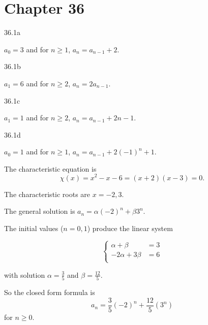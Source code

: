    \section*{Chapter 36}
   
       
\begin{Solution}{36.1a}

$a_{0} = 3$ and for $n\geq 1$, $a_{n} = a_{n-1}+2$.

\end{Solution}

\begin{Solution}{36.1b}

$a_{1} = 6$ and for $n\geq 2$, $a_{n} = 2a_{n-1}$.

\end{Solution}


\begin{Solution}{36.1c}

$a_{1} = 1$ and for $n\geq 2$, $a_{n} = a_{n-1} + 2n-1$.

\end{Solution}


\begin{Solution}{36.1d}

$a_{0} = 1$ and for $n\geq 1$, $a_{n} = a_{n-1}+2(-1)^n+1$.

\end{Solution}


\begin{Solution}{36.2}

The characteristic equation is 
\[
\chi(x) = x^{2} - x -6 = (x+2)(x-3) =0.
\] 

The characteristic roots are $x = -2, 3$.

The general solution is $a_{n}=\alpha (-2)^{n} + \beta3^{n}$.

The initial values ($n = 0,1$)  produce the linear system

\[
  \left\{
    \begin{aligned}
     \alpha + \beta &= 3\\
     -2\alpha + 3\beta &= 6\\
     \end{aligned}
   \right.
\]
   
with solution $\alpha = \frac{3}{5}$ and $\beta = \frac{12}{5}$.

So the closed form formula is 
\[
a_{n} = \frac{3}{5}(-2)^{n} +\frac{12}{5}(3^{n})
\]   
for $n\geq 0$.


\end{Solution}


